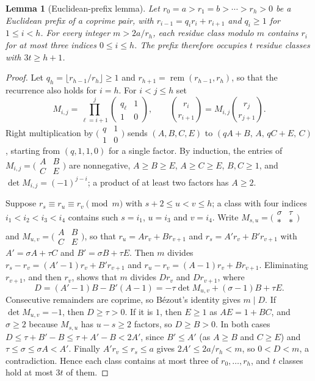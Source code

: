 \documentclass[11pt]{article}
\newtheorem{lemma}[theorem]{Lemma}
\theoremstyle{remark}
\newcommand{\rem}{\operatorname{rem}}
\begin{document}
\begin{lemma}[Euclidean-prefix lemma]\label{lem:prefix}
Let $r_0=a>r_1=b>\cdots>r_h>0$ be a Euclidean prefix of a coprime pair, with
$r_{i-1}=q_i r_i+r_{i+1}$ and $q_i\geq1$ for $1\leq i<h$. For every integer
$m>2a/r_h$, each residue class modulo $m$ contains $r_i$ for at most three
indices $0\leq i\leq h$. The prefix therefore occupies $t$ residue classes
with $3t\geq h+1$.
\end{lemma}
\begin{proof}
Let $q_h=\lfloor r_{h-1}/r_h\rfloor\geq1$ and $r_{h+1}=\rem(r_{h-1},r_h)$,
so that the recurrence also holds for $i=h$. For $i<j\leq h$ set
\[
M_{i,j}=\prod_{\ell=i+1}^{j}\begin{pmatrix}q_\ell&1\\1&0\end{pmatrix},
\qquad
\binom{r_i}{r_{i+1}}=M_{i,j}\binom{r_j}{r_{j+1}}.
\]
Right multiplication by
$\bigl(\begin{smallmatrix}q&1\\1&0\end{smallmatrix}\bigr)$ sends
$(A,B,C,E)$ to $(qA+B,\,A,\,qC+E,\,C)$, starting from $(q,1,1,0)$ for a single
factor. By induction, the entries of
$M_{i,j}=\bigl(\begin{smallmatrix}A&B\\C&E\end{smallmatrix}\bigr)$ are
nonnegative, $A\geq B\geq E$, $A\geq C\geq E$, $B,C\geq1$, and
$\det M_{i,j}=(-1)^{j-i}$; a product of at least two factors has $A\geq2$.

Suppose $r_s\equiv r_u\equiv r_v\pmod m$ with $s+2\leq u<v\leq h$; a
class with four indices $i_1<i_2<i_3<i_4$ contains such $s=i_1$, $u=i_3$
and $v=i_4$.
Write $M_{s,u}=\bigl(\begin{smallmatrix}\sigma&\tau\\\ast&\ast\end{smallmatrix}\bigr)$ and
$M_{u,v}=\bigl(\begin{smallmatrix}A&B\\C&E\end{smallmatrix}\bigr)$, so that
$r_u=Ar_v+Br_{v+1}$ and $r_s=A'r_v+B'r_{v+1}$ with $A'=\sigma A+\tau C$
and $B'=\sigma B+\tau E$. Then $m$ divides $r_s-r_v=(A'-1)r_v+B'r_{v+1}$
and $r_u-r_v=(A-1)r_v+Br_{v+1}$. Eliminating $r_{v+1}$, and then $r_v$,
shows that $m$ divides $Dr_v$ and $Dr_{v+1}$, where
\[
D=(A'-1)B-B'(A-1)=-\tau\det M_{u,v}+(\sigma-1)B+\tau E.
\]
Consecutive remainders are coprime, so B\'ezout's identity gives $m\mid D$.
If $\det M_{u,v}=-1$, then $D\geq\tau>0$. If it is $1$, then $E\geq1$ as
$AE=1+BC$, and $\sigma\geq2$ because $M_{s,u}$ has $u-s\geq2$ factors, so
$D\geq B>0$. In both cases $D\leq\tau+B'-B\leq\tau+A'-B<2A'$, since
$B'\leq A'$ (as $A\geq B$ and $C\geq E$) and $\tau\leq\sigma\leq\sigma A<A'$. Finally
$A'r_v\leq r_s\leq a$ gives $2A'\leq2a/r_h<m$, so $0<D<m$, a
contradiction. Hence each class contains at most three of
$r_0,\ldots,r_h$, and $t$ classes hold at most $3t$ of them.
\end{proof}
\end{document}
